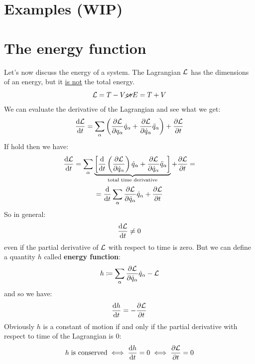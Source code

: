 \section{Examples (WIP)}
\section{The energy function}
Let's now discuss the energy of a system. The Lagrangian $\mathcal{L}$ has the dimensions of an energy, but it \underline{is not} the total energy.
\begin{equation}
    \mathcal{L} = T - V \cancel{\Leftrightarrow} E = T + V
\end{equation}
We can evaluate the derivative of the Lagrangian and see what we get:
\begin{equation}
    \dfrac{\dd{\lagr}}{\dd{t}} = \bigsum_{\alpha}\brackets{\pdv{\lagr}{q_{\alpha}}\dot{q}_{\alpha} + \pdv{\lagr}{\dot{q}_{\alpha}}\ddot{q}_{\alpha}} + \dfrac{\partial \lagr}{\partial t}
\end{equation}
If \eleref\;hold then we have:
\begin{equation}
    \dfrac{\dd{\lagr}}{\dd{t}} = \bigsum_{\alpha}\underbrace{\left[\dv{}{t}\brackets{\pdv{\lagr}{\dot{q}_{\alpha}}}\dot{q}_{\alpha} + \pdv{\lagr}{\dot{q}_{\alpha}}\ddot{q}_{\alpha}\right]}_{\text{total time derivative}} + \dfrac{\partial \lagr}{\partial t} =
\end{equation}
\begin{equation}
 = \dv{}{t}\bigsum_{\alpha}\pdv{\lagr}{\dot{q}_{\alpha}}\dot{q}_{\alpha} + \dfrac{\partial \lagr}{\partial t}
\end{equation}
So in general:
\begin{equation}
    \dfrac{\dd{\mathcal{L}}}{\dd{t}} \neq 0
\end{equation}
even if the partial derivative of $\mathcal{L}$ with respect to time is zero. But we can define a quantity $h$ called \textbf{energy function}:
\begin{equation}
    h \defineeq \bigsum_{\alpha}\pdv{\lagr}{\dot{q}_{\alpha}}\dot{q}_{\alpha} - \lagr
\end{equation}
and so we have:
\begin{equation}
    \dfrac{\dd{h}}{\dd{t}} = -\dfrac{\partial \mathcal{L}}{\partial t}
\end{equation}
Obviously $h$ is a constant of motion if and only if the partial derivative with respect to time of the Lagrangian is 0:
\begin{equation}
    h\;\text{is conserved} \iff \dfrac{\dd{h}}{\dd{t}} = 0 \iff \dfrac{\partial \mathcal{L}}{\partial t} = 0
\end{equation}
